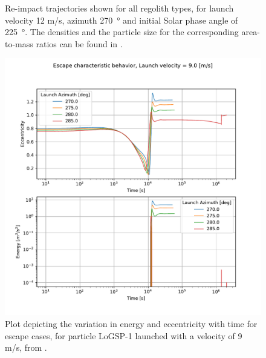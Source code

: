 \documentclass[print]{tudelft-report}
\begin{document}
\begin{appendices}
\begin{figure}[htb]
    \caption{Re-impact trajectories shown for all regolith types, for launch velocity 12 m/s, azimuth \SI{270}{\degree} and initial Solar phase angle of \SI{225}{\degree}. The densities and the particle size for the corresponding area-to-mass ratios can be found in .}
    \label{fig:trailingEdge_reimpact_traj_12ms_270azim_225solar}
    \end{figure}
    \FloatBarrier
    \begin{figure}[htb]
    \centering
    \captionsetup{justification=centering}
    \includegraphics[width=\textwidth, height=0.6\textheight, keepaspectratio=true]{Results/Images/trailing_edge_perturbations/logsp1_escape_energy_ecc_9ms_solarPhase225.pdf}
    \caption{Plot depicting the variation in energy and eccentricity with time for escape cases, for particle LoGSP-1 launched with a velocity of 9 m/s, from \protect{}.}
    \label{fig:trailingEdge_logsp1_escape_energy_ecc_9ms_solar225}
    \end{figure}
    \FloatBarrier
    \begin{figure}[htb]
    \centering
    \captionsetup{justification=centering}

\end{figure}
\end{appendices}
\end{document}
